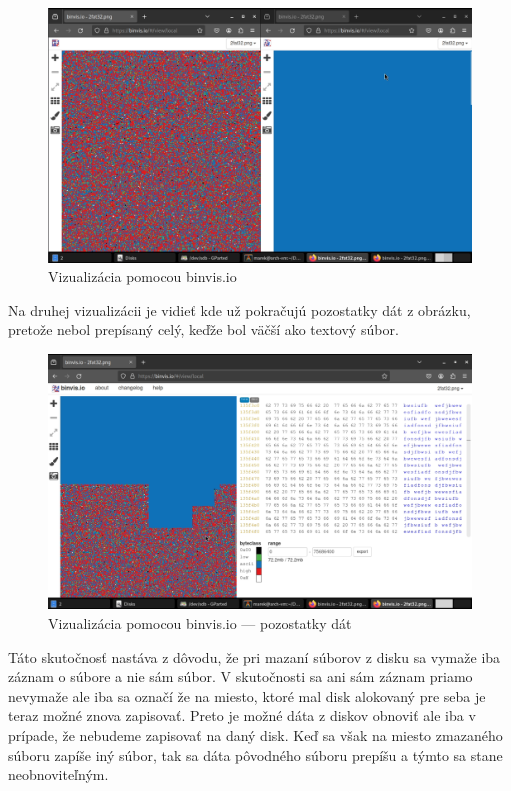 \documentclass[12pt,oneside,slovak,a4paper]{article}
\begin{document}
\begin{figure}[H]
	\centering
	\includegraphics[width=\linewidth]{./images/testdisk_testing/overriden_deleted_file.png}
	\centering
	\captionsetup{justification=centering,margin=2cm}
	\caption{Vizualizácia pomocou binvis.io}
\end{figure}

Na druhej vizualizácii je vidieť kde už pokračujú pozostatky dát z obrázku, pretože nebol prepísaný celý, keďže bol väčší ako textový súbor.

\begin{figure}[H]
	\centering
	\includegraphics[width=\linewidth]{./images/testdisk_testing/overriden_deleted_file2.png}
	\centering
	\captionsetup{justification=centering,margin=2cm}
	\caption{Vizualizácia pomocou binvis.io --- pozostatky dát}
\end{figure}

Táto skutočnosť nastáva z dôvodu, že pri mazaní súborov z disku sa vymaže iba záznam o súbore a nie sám súbor. V skutočnosti sa ani sám záznam priamo nevymaže ale iba sa označí že na miesto, ktoré mal disk alokovaný pre seba je teraz možné znova zapisovať. Preto je možné dáta z diskov obnoviť ale iba v prípade, že nebudeme zapisovať na daný disk. Keď sa však na miesto zmazaného súboru zapíše iný súbor, tak sa dáta pôvodného súboru prepíšu a týmto sa stane neobnoviteľným.
\end{document}
